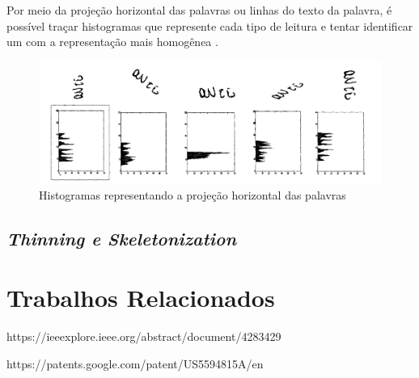 Por meio da projeção horizontal das palavras ou linhas do texto da palavra, é possível traçar histogramas que represente cada tipo de leitura e tentar identificar um com a representação mais homogênea \cite{skew-correction-and-slant-removal}.

\begin{figure}[h]
  \centering
  \caption{Histogramas representando a projeção horizontal das palavras}
  \includegraphics[scale=0.45]{figuras/skew-correction.png}
\end{figure}


\subsection{\textit{Thinning e Skeletonization}}


\section{Trabalhos Relacionados}

https://ieeexplore.ieee.org/abstract/document/4283429

https://patents.google.com/patent/US5594815A/en

